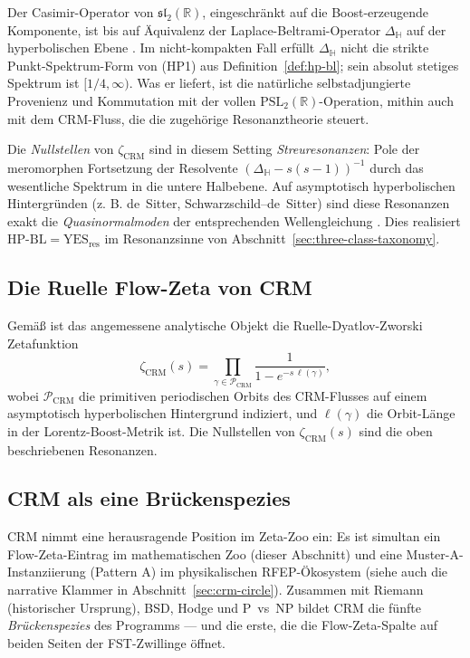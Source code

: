 \documentclass[11pt]{article}
\theoremstyle{definition}
\theoremstyle{remark}
\newcommand{\HBL}{\mathrm{HP\text{-}BL}}
\newcommand{\PSL}{\mathrm{PSL}}
\begin{document}
Der Casimir-Operator von $\mathfrak{sl}_2(\mathbb{R})$, eingeschränkt auf die
Boost-erzeugende Komponente, ist bis auf Äquivalenz der
Laplace-Beltrami-Operator $\Delta_{\mathbb{H}}$ auf der hyperbolischen
Ebene \cite{DyatlovZworski2019}. Im nicht-kompakten Fall erfüllt
$\Delta_{\mathbb{H}}$ nicht die strikte Punkt-Spektrum-Form von (HP1) aus
Definition~\ref{def:hp-bl}; sein absolut stetiges Spektrum ist
$[1/4,\infty)$. Was er liefert, ist die natürliche selbstadjungierte
Provenienz und Kommutation mit der vollen $\PSL_2(\mathbb{R})$-Operation,
mithin auch mit dem CRM-Fluss, die die zugehörige Resonanztheorie steuert.

Die \emph{Nullstellen} von $\zeta_{\mathrm{CRM}}$ sind in diesem Setting
\emph{Streuresonanzen}: Pole der meromorphen Fortsetzung
der Resolvente $(\Delta_{\mathbb{H}} - s(s-1))^{-1}$ durch das
wesentliche Spektrum in die untere Halbebene. Auf asymptotisch
hyperbolischen Hintergründen (z. B. de~Sitter, Schwarzschild--de~Sitter)
sind diese Resonanzen exakt die \emph{Quasinormalmoden} der
entsprechenden Wellengleichung \cite{DyatlovZworski2019}. Dies realisiert
$\HBL = \mathrm{YES}_{\mathrm{res}}$ im Resonanzsinne von
Abschnitt~\ref{sec:three-class-taxonomy}.

\subsection{Die Ruelle Flow-Zeta von CRM}

Gemäß \cite{DyatlovZworski2019} ist das angemessene analytische Objekt
die Ruelle-Dyatlov-Zworski Zetafunktion
\begin{equation}
\label{eq:crm-flow-zeta}
  \zeta_{\mathrm{CRM}}(s)
  = \prod_{\gamma \in \mathcal{P}_{\mathrm{CRM}}}
    \frac{1}{1 - e^{-s\,\ell(\gamma)}},
\end{equation}
wobei $\mathcal{P}_{\mathrm{CRM}}$ die primitiven periodischen
Orbits des CRM-Flusses auf einem asymptotisch hyperbolischen Hintergrund indiziert,
und $\ell(\gamma)$ die Orbit-Länge in der Lorentz-Boost-Metrik ist.
Die Nullstellen von $\zeta_{\mathrm{CRM}}(s)$ sind die oben beschriebenen
Resonanzen.

\subsection{CRM als eine Brückenspezies}

CRM nimmt eine herausragende Position im Zeta-Zoo ein: Es
ist simultan ein Flow-Zeta-Eintrag im mathematischen Zoo (dieser
Abschnitt) und eine Muster-A-Instanziierung (Pattern A) im physikalischen RFEP-Ökosystem
\cite{RFEPFramework} (siehe auch die narrative Klammer in
Abschnitt~\ref{sec:crm-circle}). Zusammen mit Riemann (historischer
Ursprung), BSD, Hodge und P~vs~NP bildet CRM die fünfte
\emph{Brückenspezies} des Programms --- und die erste, die die
Flow-Zeta-Spalte auf beiden Seiten der FST-Zwillinge öffnet.
\end{document}
